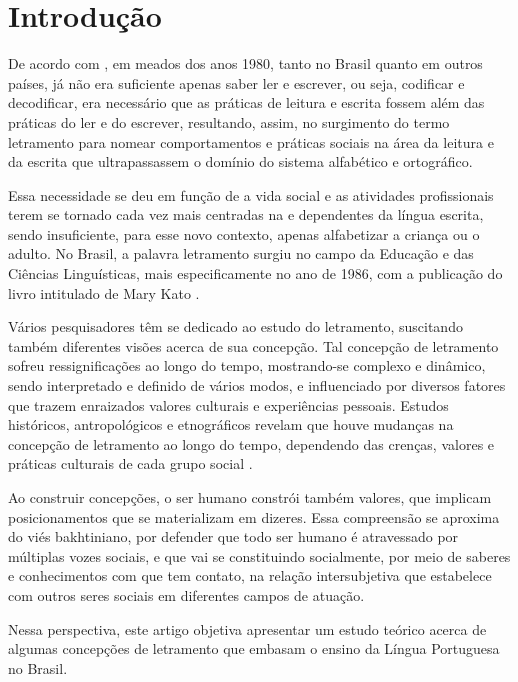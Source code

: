 \documentclass{textolivre}
\newcommand\theauthorname[1]{\capitalisewords{\expandafter\citefirstlastauthor{#1}}}
\begin{document}
\section{Introdução}\label{sec-intro}
De acordo com \textcite{soares2017}, em meados dos anos 1980, tanto no Brasil quanto em
outros países, já não era suficiente apenas saber ler e escrever, ou seja,
codificar e decodificar, era necessário que as práticas de leitura e escrita
fossem além das práticas do ler e do escrever, resultando, assim, no surgimento
do termo letramento para nomear comportamentos e práticas sociais na área da
leitura e da escrita que ultrapassassem o domínio do sistema alfabético e
ortográfico.

Essa necessidade se deu em função de a vida social e as atividades
profissionais terem se tornado cada vez mais centradas na e dependentes da
língua escrita, sendo insuficiente, para esse novo contexto, apenas alfabetizar
a criança ou o adulto. No Brasil, a palavra letramento surgiu no campo da
Educação e das Ciências Linguísticas, mais especificamente no ano de 1986, com
a publicação do livro intitulado  de 
Mary Kato
\cite{soares2017}.

Vários pesquisadores têm se dedicado ao estudo do letramento, suscitando também
diferentes visões acerca de sua concepção. Tal concepção de letramento sofreu
ressignificações ao longo do tempo, mostrando-se complexo e dinâmico, sendo
interpretado e definido de vários modos, e influenciado por diversos fatores
que trazem enraizados valores culturais e experiências pessoais. Estudos
históricos, antropológicos e etnográficos revelam que houve mudanças na
concepção de letramento ao longo do tempo, dependendo das crenças, valores e
práticas culturais de cada grupo social \cite{soares2004}.

Ao construir concepções, o ser humano constrói também valores, que implicam
posicionamentos que se materializam em dizeres. Essa compreensão se aproxima do
viés bakhtiniano, por defender que todo ser humano é atravessado por múltiplas
vozes sociais, e que vai se constituindo socialmente, por meio de saberes e
conhecimentos com que tem contato, na relação intersubjetiva que estabelece com
outros seres sociais em diferentes campos de atuação.

Nessa perspectiva, este artigo objetiva apresentar um estudo teórico acerca de
algumas concepções de letramento que embasam o ensino da Língua Portuguesa no
Brasil.
\end{document}
